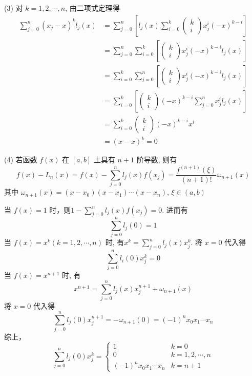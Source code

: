 \begin{tcolorbox}
(3) 对 $ k=1,2, \cdots, n $, 由二项式定理得
$$
\begin{aligned}
\sum_{j=0}^{n}\left(x_{j}-x\right)^{k} l_{j}(x) & =\sum_{j=0}^{n}\left[l_{j}(x) \sum_{i=0}^{k}\left(\begin{array}{l}
k \\
i
\end{array}\right) x_{j}^{i}(-x)^{k-i}\right] \\
& =\sum_{j=0}^{n} \sum_{i=0}^{k}\left[\left(\begin{array}{l}
k \\
i
\end{array}\right) x_{j}^{i}(-x)^{k-i} l_{j}(x)\right] \\
& =\sum_{i=0}^{k} \sum_{j=0}^{n}\left[\left(\begin{array}{l}
k \\
i
\end{array}\right) x_{j}^{i}(-x)^{k-i} l_{j}(x)\right] \\
& =\sum_{i=0}^{k}\left[\left(\begin{array}{l}
k \\
i
\end{array}\right)(-x)^{k-i} \sum_{j=0}^{n} x_{j}^{i} l_{j}(x)\right] \\
& =\sum_{i=0}^{k}\left(\begin{array}{l}
k \\
i
\end{array}\right)(-x)^{k-i} x^{i} \\
& =(x-x)^{k}=0
\end{aligned}
$$


(4) 若函数 $ f(x) $ 在 $ [a, b] $ 上具有 $ n+1 $ 阶导数, 则有
$$
f(x)-L_n(x)=f(x)-\sum_{j=0}^{n} l_{j}(x) f\left(x_{j}\right)=\frac{f^{(n+1)}(\xi)}{(n+1) !} \omega_{n+1}(x)
$$
其中 $ \omega_{n+1}(x)=\left(x-x_{0}\right)\left(x-x_{1}\right) \cdots\left(x-x_{n}\right) $, $\xi \in (a,b)$


当 $ f(x)=1 $ 时，则$1-\sum\limits_{j=0}^{n} l_{j}(x) f\left(x_{j}\right)=0$.
进而有
$$
\sum_{j=0}^{n} l_{j}(0)=1
$$
当 $ f(x)=x^{k}(k=1,2, \cdots, n) $ 时, 有$x^{k}=\sum\limits_{j=0}^{n} l_{j}(x) x_{j}^{k}$.
将 $ x=0 $ 代入得
$$
\sum_{j=0}^{n} l_{i}(0) x_{j}^{k}=0
$$
当 $ f(x)=x^{n+1} $ 时, 有
$$
x^{n+1}=\sum_{j=0}^{n} l_{j}(x) x_{j}^{n+1}+\omega_{n+1}(x)
$$
将 $ x=0 $ 代入得
$$
\sum_{j=0}^{n} l_{j}(0) x_{j}^{n+1}=-\omega_{n+1}(0)=(-1)^{n} x_{0} x_{1} \cdots x_{n}
$$
综上，
$$ \sum\limits_{j=0}^{n} l_{j}(0) x_{j}^{k}=\left\{\begin{array}{ll}1 & k=0 \\ 0 & k=1,2, \cdots, n \\ (-1)^{n} x_{0} x_{1} \cdots x_{n} & k=n+1\end{array}\right. $$


\end{tcolorbox}
